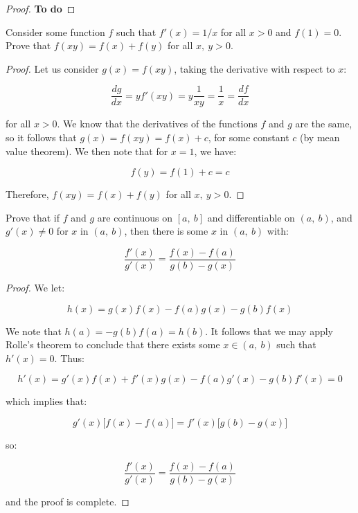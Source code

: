 \documentclass[10pt, oneside]{amsart}
\newenvironment{problem}[2][Problem]{\begin{trivlist}
\item[\hskip \labelsep {\bfseries #1}\hskip \labelsep {\bfseries #2.}]}{\end{trivlist}}
\begin{document}
    \begin{proof}
      \textbf{To do}
    \end{proof}

    \begin{problem}{11.40}
      Consider some function $f$ such that $f'(x) = 1/x$ for all $x > 0$ and $f(1) = 0$. Prove that $f(xy) = f(x) + f(y)$ for all $x, \ y > 0$.
    \end{problem}

    \begin{proof}
      Let us consider $g(x) = f(xy)$, taking the derivative with respect to $x$:

      $$\frac{dg}{dx} = y f'(xy) = y \frac{1}{xy} = \frac{1}{x} = \frac{df}{dx}$$

      for all $x > 0$. We know that the derivatives of the functions $f$ and $g$ are the same, so it follows that $g(x) = f(xy) = f(x) + c$, for
      some constant $c$ (by mean value theorem). We then note that for $x = 1$, we have:

      $$f(y) = f(1) + c = c$$

      Therefore, $f(xy) = f(x) + f(y)$ for all $x, \ y > 0$.
    \end{proof}

    \begin{problem}{11.47}
      Prove that if $f$ and $g$ are continuous on $[a, \ b]$ and differentiable on $(a, \ b)$, and $g'(x) \neq 0$ for $x$ in $(a, \ b)$, then
      there is some $x$ in $(a, \ b)$ with:

      $$\frac{f'(x)}{g'(x)} = \frac{f(x) - f(a)}{g(b) - g(x)}$$
    \end{problem}

    \begin{proof}
      We let:

      $$h(x) = g(x) f(x) - f(a) g(x) - g(b) f(x)$$

      We note that $h(a) = - g(b) f(a) = h(b)$. It follows that we may apply Rolle's theorem to conclude that there exists
      some $x \in (a, \ b)$ such that $h'(x) = 0$. Thus:

      $$h'(x) = g'(x) f(x) + f'(x) g(x) - f(a) g'(x) - g(b) f'(x) = 0$$

      which implies that:

      $$g'(x) \big[ f(x) - f(a) \big] = f'(x) \big[ g(b) - g(x) \big]$$

      so:

      $$\frac{f'(x)}{g'(x)} = \frac{f(x) - f(a)}{g(b) - g(x)}$$

      and the proof is complete.
    \end{proof}
\end{document}
